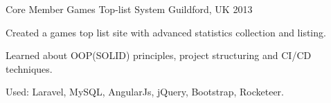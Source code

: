 \begin{cventries}
  \cventry
    {Core Member} %
    {Games Top-list System} %
    {Guildford, UK} %
    {2013} %
    {
      \begin{cvitems} %
        \item {Created a games top list site with advanced statistics collection and listing.}
        \item {Learned about OOP(SOLID) principles, project structuring and CI/CD techniques.}
        \item {Used: Laravel, MySQL, AngularJs, jQuery, Bootstrap, Rocketeer.}
      \end{cvitems}
    }

\end{cventries}
